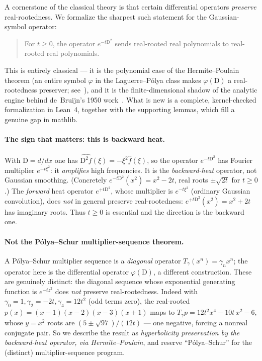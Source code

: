 \documentclass[11pt]{article}
\theoremstyle{definition}
\theoremstyle{remark}
\newcommand{\D}{\mathrm{D}}
\begin{document}
A cornerstone of the classical theory is that certain differential operators \emph{preserve}
real-rootedness. We formalize the sharpest such statement for the Gaussian-symbol operator:

\begin{quote}
For $t \ge 0$, the operator $e^{-t\D^2}$ sends real-rooted real polynomials to real-rooted real
polynomials.
\end{quote}

This is entirely classical --- it is the polynomial case of the Hermite--Poulain theorem (an entire
symbol $\varphi$ in the Laguerre--P\'olya class makes $\varphi(\D)$ a real-rootedness preserver;
see~\cite{rahman-schmeisser}), and it is the finite-dimensional shadow of the analytic engine behind
de~Bruijn's 1950 work~\cite{debruijn}. What is new is a complete, kernel-checked formalization in
Lean~4, together with the supporting lemmas, which fill a genuine gap in mathlib.

\paragraph{The sign that matters: this is backward heat.}
With $\D = d/dx$ one has $\widehat{\D^2 f}(\xi) = -\xi^2 \widehat{f}(\xi)$, so the operator
$e^{-t\D^2}$ has Fourier multiplier $e^{+t\xi^2}$: it \emph{amplifies} high frequencies. It is the
\emph{backward-heat} operator, not Gaussian smoothing. (Concretely $e^{-t\D^2}(x^2) = x^2 - 2t$, real
roots $\pm\sqrt{2t}$ for $t\ge 0$.) The \emph{forward} heat operator $e^{+t\D^2}$, whose multiplier is
$e^{-t\xi^2}$ (ordinary Gaussian convolution), does \emph{not} in general preserve real-rootedness:
$e^{+t\D^2}(x^2) = x^2 + 2t$ has imaginary roots. Thus $t\ge 0$ is essential and the direction is the
backward one.

\paragraph{Not the P\'olya--Schur multiplier-sequence theorem.}
A P\'olya--Schur multiplier sequence is a \emph{diagonal} operator $T_\gamma(x^n) = \gamma_n x^n$; the
operator here is the differential operator $\varphi(\D)$, a different construction. These are genuinely
distinct: the diagonal sequence whose exponential generating function is $e^{-tz^2}$ does \emph{not}
preserve real-rootedness. Indeed with $\gamma_0=1,\gamma_2=-2t,\gamma_4=12t^2$ (odd terms zero), the
real-rooted $p(x)=(x-1)(x-2)(x-3)(x+1)$ maps to $T_\gamma p = 12t^2x^4 - 10t\,x^2 - 6$, whose
$y=x^2$ roots are $(5\pm\sqrt{97})/(12t)$ --- one negative, forcing a nonreal conjugate pair. So we
describe the result as \emph{hyperbolicity preservation by the backward-heat operator, via
Hermite--Poulain}, and reserve ``P\'olya--Schur'' for the (distinct) multiplier-sequence program.
\end{document}
